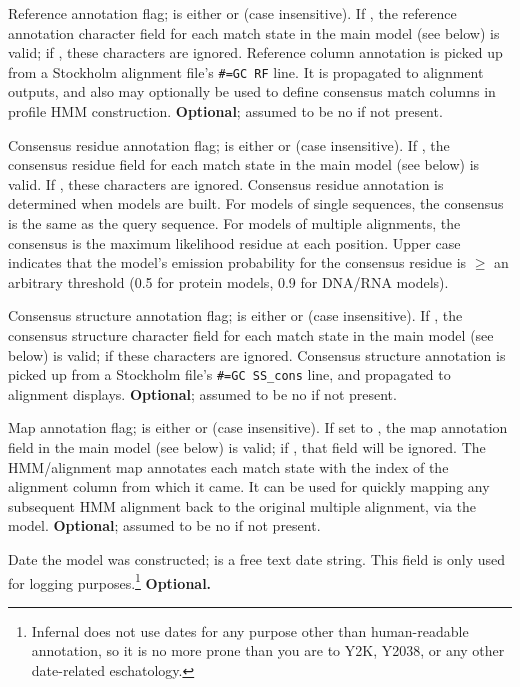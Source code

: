 \begin{sreitems}{}
\item [\emprog{RF <s>}] Reference annotation flag;  is
either  or  (case insensitive). If , the
reference annotation character field for each match state in the main
model (see below) is valid; if , these characters are
ignored.  Reference column annotation is picked up from a Stockholm
alignment file's \verb+#=GC RF+ line. It is propagated to alignment
outputs, and also may optionally be used to define consensus match
columns in profile HMM construction. \textbf{Optional}; assumed to be
no if not present.

\item [\emprog{CONS <s>}] Consensus residue annotation flag;
   is either  or  (case insensitive).  If
  , the consensus residue field for each match state in the
  main model (see below) is valid. If , these characters are
  ignored. Consensus residue annotation is determined when models are
  built. For models of single sequences, the consensus is the same as
  the query sequence. For models of multiple alignments, the consensus
  is the maximum likelihood residue at each position. Upper case
  indicates that the model's emission probability for the consensus
  residue is $\geq$ an arbitrary threshold (0.5 for protein models,
  0.9 for DNA/RNA models).

\item [\emprog{CS <s>}] Consensus structure annotation flag;
 is either  or  (case insensitive). If
, the consensus structure character field for each match
state in the main model (see below) is valid; if  these
characters are ignored. Consensus structure annotation is picked up
from a Stockholm file's \verb+#=GC SS_cons+ line, and propagated to
alignment displays.  \textbf{Optional}; assumed to be no if not
present.

\item [\emprog{MAP <s>}] Map annotation flag;  is either
 or  (case insensitive).  If set to , the
map annotation field in the main model (see below) is valid; if
, that field will be ignored.  The HMM/alignment map
annotates each match state with the index of the alignment column from
which it came. It can be used for quickly mapping any subsequent
HMM alignment back to the original multiple alignment, via the model.
\textbf{Optional}; assumed to be no if not present.

\item [\emprog{DATE <s>}] Date the model was constructed; 
is a free text date string.  This field is only used for logging
purposes.\footnote{Infernal does not use dates for any purpose other than
human-readable annotation, so it is no more prone than you are to Y2K,
Y2038, or any other date-related eschatology.} \textbf{Optional.}


\end{sreitems}
